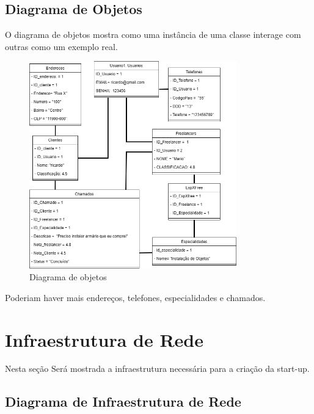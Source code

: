 \documentclass[
  a4paper,%
  12pt,%
  english,%
  brazilian,%
]{article}
\begin{document}
\break

\subsection*{Diagrama de Objetos}

    O diagrama de objetos mostra como uma instância de uma classe interage com outras como um exemplo real.

\begin{figure}[h]
\centering
\caption{Diagrama de objetos}%
\label{fig:diagrama-objetos}
 \includegraphics[width=0.8\textwidth]{fotos/DiagramaObjetopi.png}
\end{figure}

    Poderiam haver mais endereços, telefones, especialidades e chamados.

\break

\section*{Infraestrutura de Rede}
    Nesta seção Será mostrada a infraestrutura necessária para a criação da start-up.

    
\subsection*{Diagrama de Infraestrutura de Rede}
\end{document}
